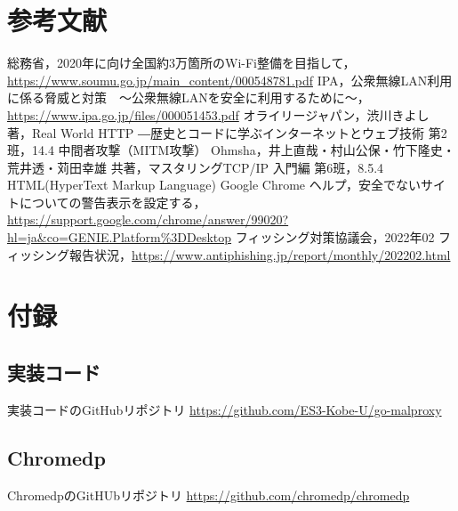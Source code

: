 \documentclass[dvipdfmx]{jsarticle}
\begin{document}
        \section{参考文献}
            \begin{thebibliography}{9}
                 総務省，2020年に向け全国約3万箇所のWi-Fi整備を目指して，\url{https://www.soumu.go.jp/main_content/000548781.pdf}
                 IPA，公衆無線LAN利用に係る脅威と対策　～公衆無線LANを安全に利用するために～，\url{https://www.ipa.go.jp/files/000051453.pdf}
                 オライリージャパン，渋川きよし 著，Real World HTTP ―歴史とコードに学ぶインターネットとウェブ技術 第2班，14.4 中間者攻撃（MITM攻撃）
                 Ohmsha，井上直哉・村山公保・竹下隆史・荒井透・苅田幸雄 共著，マスタリングTCP/IP 入門編 第6班，8.5.4 HTML(HyperText Markup Language)
                 Google Chrome ヘルプ，安全でないサイトについての警告表示を設定する，\url{https://support.google.com/chrome/answer/99020?hl=ja&co=GENIE.Platform%3DDesktop}
                 フィッシング対策協議会，2022年02 フィッシング報告状況，\url{https://www.antiphishing.jp/report/monthly/202202.html}
            \end{thebibliography}
        
        \section{付録}
            \subsection{実装コード}
                実装コードのGitHubリポジトリ \url{https://github.com/ES3-Kobe-U/go-malproxy}
            \subsection{Chromedp}
                ChromedpのGitHUbリポジトリ \url{https://github.com/chromedp/chromedp}
\end{document}
